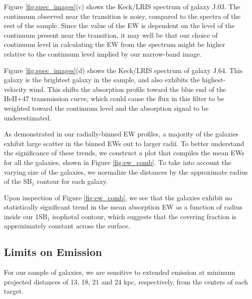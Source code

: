 \documentclass[twocolumn]{aastex61}
\begin{document}
Figure \ref{fig:spec_images}(c) shows the Keck/LRIS spectrum of galaxy J.03. The continuum observed near the  transition is noisy, compared to the spectra of the rest of the sample. Since the value of the EW is dependent on the level of the continuum present near the  transition, it may well be that our choice of continuum level in calculating the EW from the spectrum might be higher relative to the continuum level implied by our narrow-band image.


Figure \ref{fig:spec_images}(d) shows the Keck/LRIS spectrum of galaxy J.64. This galaxy is the brightest galaxy in the sample, and also exhibits the highest-velocity wind.  This shifts the  absorption profile toward the blue end of the 
HeII+47 transmission curve, which could cause the flux in this filter to be weighted toward the continuum level and the absorption signal to be underestimated.

As demonstrated in our radially-binned EW profiles, a majority of the galaxies exhibit large scatter in the binned EWs out to larger radii. To better understand the significance of these trends, we construct a plot that compiles the mean EWs for all the galaxies, shown in Figure \ref{fig:ew_comb}. To take into account the varying size of the galaxies, we normalize the distances by the approximate radius of the SB$_1$ contour for each galaxy. 

Upon inspection of Figure \ref{fig:ew_comb}, we see that the galaxies exhibit no statistically significant trend in the mean absorption EW as a function of radius inside our 1SB$_1$ isophotal contour, which suggests that the covering fraction is approximately constant across the surface.

\subsection{Limits on  Emission}
For our sample of galaxies, we are sensitive to extended emission at minimum projected distances of 
13, 18, 21 and 24 kpc, respectively, from the centers of each target.
\end{document}
